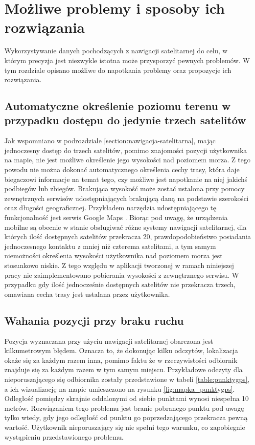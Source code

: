 \section{Możliwe problemy i sposoby ich rozwiązania}
Wykorzystywanie danych pochodzących z nawigacji satelitarnej do celu, w którym precyzja jest niezwykle istotna może przysporzyć pewnych problemów. W tym rozdziale opisano możliwe do napotkania problemy oraz propozycje ich rozwiązania.
\subsection{Automatyczne określenie poziomu terenu w przypadku dostępu do jedynie trzech satelitów}\label{chap:problem-poziom-terenu}
Jak wspomniano w podrozdziale \ref{section:nawigacja-satelitarna}, mając jednoczesny dostęp do trzech satelitów, pomimo znajomości pozycji użytkownika na mapie, nie jest możliwe określenie jego wysokości nad poziomem morza. Z tego powodu nie można dokonać automatycznego określenia cechy trasy, która daje biegaczowi informacje na temat tego, czy możliwe jest napotkanie na niej jakichś podbiegów lub zbiegów. Brakująca wysokość może zostać ustalona przy pomocy zewnętrznych serwisów udostępniających brakującą daną na podstawie szerokości oraz długości geograficznej. Przykładem narzędzia udostępniającego tę funkcjonalność jest serwis Google Maps \cite{googlemaps}. Biorąc pod uwagę, że urządzenia mobilne są obecnie w stanie obsługiwać różne systemy nawigacji satelitarnej, dla których ilość dostępnych satelitów przekracza 20, prawdopodobieństwo posiadania jednoczesnego kontaktu z mniej niż czterema satelitami, a tym samym niemożności określenia wysokości użytkownika nad poziomem morza jest stosunkowo niskie. Z tego względu w aplikacji tworzonej w ramach niniejszej pracy nie zaimplementowano pobierania wysokości z zewnętrznego serwisu. W przypadku gdy ilość jednocześnie dostępnych satelitów nie przekracza trzech, omawiana cecha trasy jest ustalana przez użytkownika.
\subsection{Wahania pozycji przy braku ruchu}\label{chap:wahania-pozycji}
Pozycja wyznaczana przy użyciu nawigacji satelitarnej obarczona jest kilkumetrowym błędem. Oznacza to, że dokonując kilku odczytów, lokalizacja okaże się za każdym razem inna, pomimo faktu że w rzeczywistości odbiornik znajduje się za każdym razem w tym samym miejscu. Przykładowe odczyty dla nieporuszającego się odbiornika zostały przedstawione w tabeli \ref{table:punktygps}, a ich wizualizację na mapie umieszczono na rysunku \ref{fig:mapka_punktygps}. Odległość pomiędzy skrajnie oddalonymi od siebie punktami wynosi niespełna 10 metrów. Rozwiązaniem tego problemu jest branie pobranego punktu pod uwagę tylko wtedy, gdy jego odległość od punktu go poprzedzającego przekracza pewną wartość. Użytkownik nieporuszający się nie spełni tego warunku, co zapobiegnie wystąpieniu przedstawionego problemu.

